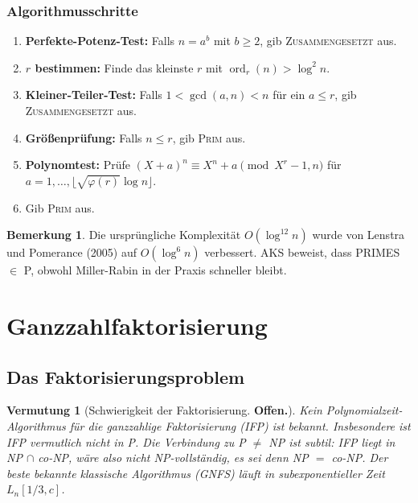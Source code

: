 \documentclass[12pt,a4paper]{amsart}
\newtheorem{vermutung}[theorem]{Vermutung}
\theoremstyle{definition}
\newtheorem{bemerkung}[theorem]{Bemerkung}
\begin{document}
\subsubsection*{Algorithmusschritte}
\begin{enumerate}[label=\arabic*.]
  \item \textbf{Perfekte-Potenz-Test:} Falls $n = a^b$ mit $b \ge 2$,
    gib \textsc{Zusammengesetzt} aus.
  \item \textbf{$r$ bestimmen:} Finde das kleinste $r$ mit
    $\operatorname{ord}_r(n) > \log^2 n$.
  \item \textbf{Kleiner-Teiler-Test:} Falls $1 < \gcd(a,n) < n$ für ein
    $a \le r$, gib \textsc{Zusammengesetzt} aus.
  \item \textbf{Größenprüfung:} Falls $n \le r$, gib \textsc{Prim} aus.
  \item \textbf{Polynomtest:} Prüfe $(X+a)^n \equiv X^n + a \pmod{X^r-1, n}$
    für $a = 1, \ldots, \lfloor\sqrt{\varphi(r)}\log n\rfloor$.
  \item Gib \textsc{Prim} aus.
\end{enumerate}

\begin{bemerkung}
Die ursprüngliche Komplexität $O(\log^{12} n)$ wurde von Lenstra und Pomerance
(2005) auf $O(\log^6 n)$ verbessert. AKS beweist, dass \textsc{PRIMES} $\in$ P,
obwohl Miller-Rabin in der Praxis schneller bleibt.
\end{bemerkung}

\section{Ganzzahlfaktorisierung}

\subsection{Das Faktorisierungsproblem}

\begin{vermutung}[Schwierigkeit der Faktorisierung. \textbf{Offen.}]
Kein Polynomialzeit-Algorithmus für die ganzzahlige Faktorisierung (IFP) ist bekannt.
Insbesondere ist IFP vermutlich nicht in P. Die Verbindung zu P $\ne$ NP ist subtil:
IFP liegt in NP $\cap$ co-NP, wäre also nicht NP-vollständig, es sei denn
NP $=$ co-NP. Der beste bekannte klassische Algorithmus (GNFS) läuft in
subexponentieller Zeit $L_n[1/3, c]$.
\end{vermutung}
\end{document}
